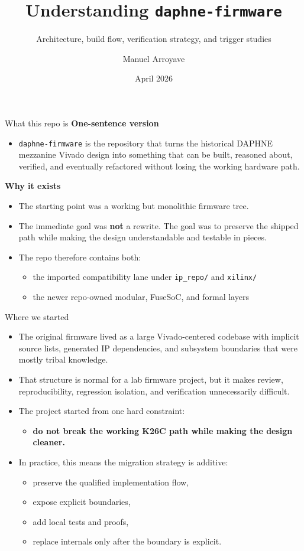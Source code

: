 \documentclass[aspectratio=169]{beamer}
\title[daphne-firmware Overview]{Understanding \texttt{daphne-firmware}}
\subtitle{Architecture, build flow, verification strategy, and trigger studies}
\author{Manuel Arroyave}
\date{April 2026}
\begin{document}
\begin{frame}
  \titlepage
\end{frame}

\begin{frame}{What this repo is}
\small
\textbf{One-sentence version}
\begin{itemize}
  \item \texttt{daphne-firmware} is the repository that turns the historical DAPHNE mezzanine Vivado design into something that can be built, reasoned about, verified, and eventually refactored without losing the working hardware path.
\end{itemize}

\vspace{1mm}
\textbf{Why it exists}
\begin{itemize}
  \item The starting point was a working but monolithic firmware tree.
  \item The immediate goal was \textbf{not} a rewrite. The goal was to preserve the shipped path while making the design understandable and testable in pieces.
  \item The repo therefore contains both:
  \begin{itemize}
    \item the imported compatibility lane under \texttt{ip\_repo/} and \texttt{xilinx/}
    \item the newer repo-owned modular, FuseSoC, and formal layers
  \end{itemize}
\end{itemize}
\end{frame}

\begin{frame}{Where we started}
\small
\begin{itemize}
  \item The original firmware lived as a large Vivado-centered codebase with implicit source lists, generated IP dependencies, and subsystem boundaries that were mostly tribal knowledge.
  \item That structure is normal for a lab firmware project, but it makes review, reproducibility, regression isolation, and verification unnecessarily difficult.
  \item The project started from one hard constraint:
  \begin{itemize}
    \item \textbf{do not break the working K26C path while making the design cleaner.}
  \end{itemize}
  \item In practice, this means the migration strategy is additive:
  \begin{itemize}
    \item preserve the qualified implementation flow,
    \item expose explicit boundaries,
    \item add local tests and proofs,
    \item replace internals only after the boundary is explicit.
  \end{itemize}
\end{itemize}
\end{frame}
\end{document}
